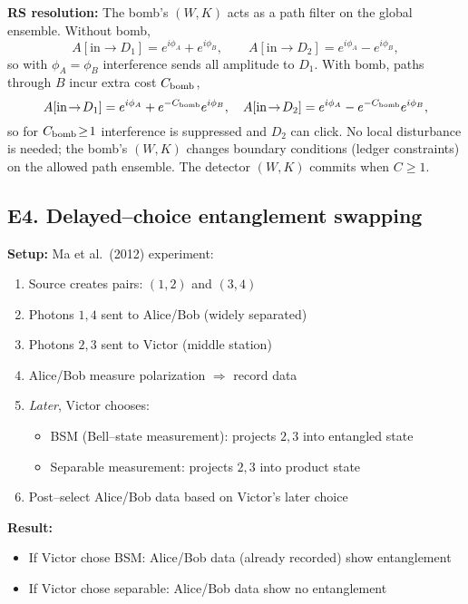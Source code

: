 \documentclass[11pt]{article}
\begin{document}
\textbf{RS resolution:}
The bomb's $(W,K)$ acts as a path filter on the global ensemble. Without bomb,
\begin{equation*}
  A[\text{in}\!\to\!D_1] = e^{i\phi_A} + e^{i\phi_B},\qquad A[\text{in}\!\to\!D_2] = e^{i\phi_A} - e^{i\phi_B},
\end{equation*}
so with $\phi_A\!=\!\phi_B$ interference sends all amplitude to $D_1$. With bomb, paths through $B$ incur extra cost $C_{\rm bomb}$,
\begin{equation*}
  A[\text{in}\!\to\!D_1] = e^{i\phi_A} + e^{-C_{\rm bomb}} e^{i\phi_B},\quad A[\text{in}\!\to\!D_2] = e^{i\phi_A} - e^{-C_{\rm bomb}} e^{i\phi_B},
\end{equation*}
so for $C_{\rm bomb}\!\ge\!1$ interference is suppressed and $D_2$ can click. No local disturbance is needed; the bomb's $(W,K)$ changes boundary conditions (ledger constraints) on the allowed path ensemble. The detector $(W,K)$ commits when $C\!\ge\!1$.

\subsection{E4. Delayed--choice entanglement swapping}

\textbf{Setup:} Ma et al.\ (2012) experiment:
\begin{enumerate}[nosep]
  \item Source creates pairs: $(1,2)$ and $(3,4)$
  \item Photons $1,4$ sent to Alice/Bob (widely separated)
  \item Photons $2,3$ sent to Victor (middle station)
  \item Alice/Bob measure polarization $\Rightarrow$ record data
  \item \emph{Later}, Victor chooses:
  \begin{itemize}[nosep]
    \item BSM (Bell--state measurement): projects $2,3$ into entangled state
    \item Separable measurement: projects $2,3$ into product state
  \end{itemize}
  \item Post--select Alice/Bob data based on Victor's later choice
\end{enumerate}

\textbf{Result:}
\begin{itemize}[nosep]
  \item If Victor chose BSM: Alice/Bob data (already recorded) show entanglement
  \item If Victor chose separable: Alice/Bob data show no entanglement
\end{itemize}
\end{document}
